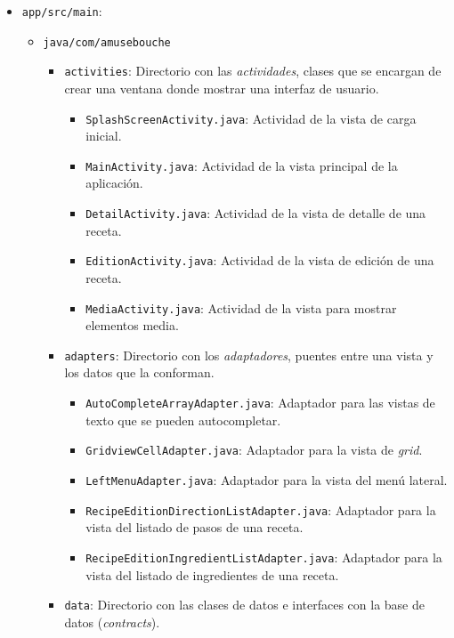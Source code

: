\begin{itemize}
\item \texttt{app/src/main}:
  \begin{itemize}
  \item \texttt{java/com/amusebouche}
    \begin{itemize}
    \item \texttt{activities}: Directorio con las \textit{actividades}, clases que se
      encargan de crear una ventana donde mostrar una interfaz de usuario.
      \begin{itemize}
      \item \texttt{SplashScreenActivity.java}: Actividad de la vista de carga
        inicial.
      \item \texttt{MainActivity.java}: Actividad de la vista principal de la
        aplicación.
      \item \texttt{DetailActivity.java}: Actividad de la vista de detalle de
        una receta.
      \item \texttt{EditionActivity.java}: Actividad de la vista de edición de
        una receta.
      \item \texttt{MediaActivity.java}: Actividad de la vista para mostrar
        elementos media.
      \end{itemize}
    \item \texttt{adapters}: Directorio con los \textit{adaptadores}, puentes
      entre una vista y los datos que la conforman.
      \begin{itemize}
      \item \texttt{AutoCompleteArrayAdapter.java}: Adaptador para las vistas
        de texto que se pueden autocompletar.
      \item \texttt{GridviewCellAdapter.java}: Adaptador para la vista de
        \textit{grid}.
      \item \texttt{LeftMenuAdapter.java}: Adaptador para la vista del menú
        lateral.
      \item \texttt{RecipeEditionDirectionListAdapter.java}: Adaptador para la
        vista del listado de pasos de una receta.
      \item \texttt{RecipeEditionIngredientListAdapter.java}: Adaptador para la
        vista del listado de ingredientes de una receta.
      \end{itemize}
    \item \texttt{data}: Directorio con las clases de datos e interfaces con
      la base de datos (\textit{contracts}).
      \begin{itemize}

\end{itemize}
\end{itemize}
\end{itemize}
\end{itemize}
